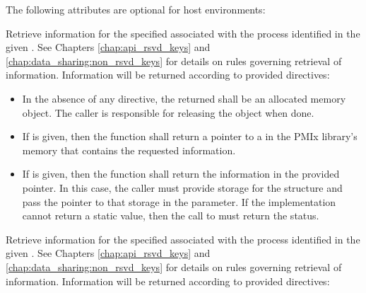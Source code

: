 
\reqattrend

\optattrstart
The following attributes are optional for host environments:


\optattrend

\descr

Retrieve information for the specified  associated with the process identified in the given . See Chapters \ref{chap:api_rsvd_keys} and \ref{chap:data_sharing:non_rsvd_keys} for details on rules governing retrieval of information. Information will be returned according to provided directives:

\begin{itemize}
    \item In the absence of any directive, the returned  shall be an allocated memory object. The caller is responsible for releasing the object when done.
    \item If  is given, then the function shall return a pointer to a  in the \ac{PMIx} library's memory that contains the requested information.
    \item If  is given, then the function shall return the information in the provided  pointer. In this case, the caller must provide storage for the structure and pass the pointer to that storage in the  parameter.  If the implementation cannot return a static value, then the call to  must return the  status.
\end{itemize}

Retrieve information for the specified  associated with the process identified in the given . See Chapters \ref{chap:api_rsvd_keys} and \ref{chap:data_sharing:non_rsvd_keys} for details on rules governing retrieval of information. Information will be returned according to provided directives:

